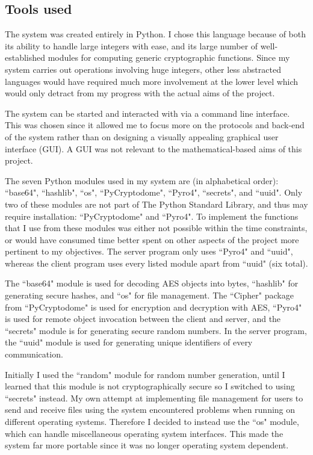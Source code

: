 \documentclass[12pt,a4paper]{article}
\begin{document}
\subsection{Tools used} \noindent \label{Tools}
The system was created entirely in Python. 
I chose this language because of both its ability to handle large integers with ease, 
and its large number of well-established modules for computing generic cryptographic functions. 
Since my system carries out operations involving huge integers, other less abstracted languages would 
have required much more involvement at the lower level which would only detract from my progress with the actual aims of the project. 

The system can be started and interacted with via a command line interface. 
This was chosen since it allowed me to focus 
more on the protocols and back-end of the system rather than on designing a visually appealing graphical user interface (GUI). 
A GUI was not relevant to the mathematical-based aims of this project. 

The seven Python modules used in my system are (in alphabetical order): 
``base64", ``hashlib", ``os", ``PyCryptodome", ``Pyro4", ``secrets", and ``uuid". 
Only two of these modules are not part of The Python Standard Library, and thus may require installation: ``PyCryptodome" and ``Pyro4". 
To implement the functions that I use from these modules was either not possible within the time constraints, 
or would have consumed time better spent on other aspects of the project more pertinent to my objectives. 
The server program only uses ``Pyro4" and ``uuid", whereas the client program uses every listed module apart from ``uuid" (six total). 

The ``base64" module is used for decoding AES objects into bytes, 
``hashlib" for generating secure hashes, 
and ``os" for file management. 
The ``Cipher" package from ``PyCryptodome" is used for encryption and decryption with AES, 
``Pyro4" is used for remote object invocation between the client and server, 
and the ``secrets" module is for generating secure random numbers. 
In the server program, the ``uuid" module is used for generating unique identifiers of every communication. 

Initially I used the ``random" module for random number generation, 
until I learned that this module is not cryptographically secure so I switched to using ``secrets" instead. 
My own attempt at implementing file management for users to send and receive files 
using the system encountered problems when running on different operating systems. 
Therefore I decided to instead use the ``os" module, which can handle miscellaneous operating system interfaces. 
This made the system far more portable since it was no longer operating system dependent. 
\end{document}
